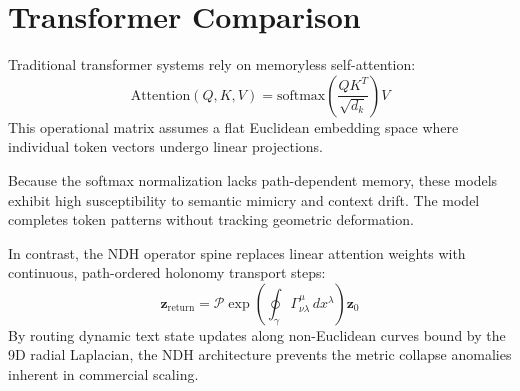 \section{Transformer Comparison}
\label{sec:transformer-comparison}

Traditional transformer systems
rely on memoryless self-attention:
\[
\text{Attention}(Q,K,V) = 
\text{softmax}\left(
\frac{QK^T}{\sqrt{d_k}}
\right)V
\]
This operational matrix assumes
a flat Euclidean embedding space
where individual token vectors
undergo linear projections.

Because the softmax normalization
lacks path-dependent memory,
these models exhibit high
susceptibility to semantic mimicry
and context drift. The model
completes token patterns without
tracking geometric deformation.

In contrast, the NDH operator spine
replaces linear attention weights
with continuous, path-ordered
holonomy transport steps:
\[
\mathbf{z}_{\text{return}} 
= \mathcal{P} \exp\left(
\oint_{\gamma} \Gamma^\mu_{\nu\lambda} 
\, dx^\lambda \right) \mathbf{z}_0
\]
By routing dynamic text state
updates along non-Euclidean curves
bound by the 9D radial Laplacian,
the NDH architecture prevents
the metric collapse anomalies
inherent in commercial scaling.
